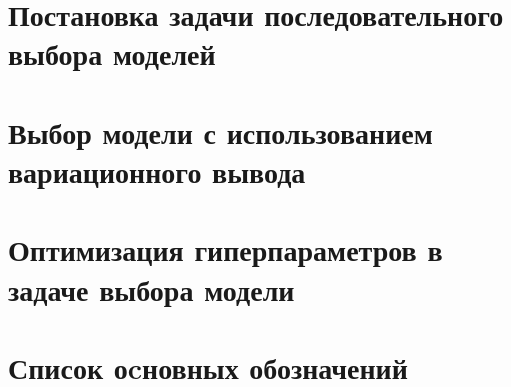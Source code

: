 \documentclass{dissert}
\theoremstyle{definition}
\begin{document}



\tableofcontents{}%

\clearpage

\chapter{Постановка задачи последовательного выбора моделей}


\clearpage
\chapter{Выбор модели с использованием вариационного вывода}


\clearpage


\chapter{Оптимизация гиперпараметров в задаче выбора модели}

\clearpage
\iffalse
\chapter{Выбор субоптимальной структуры модели}

\clearpage
\chapter{Анализ прикладных задач порождения и выбора моделей глубокого обучения}


\clearpage
\addcontentsline{toc}{section}{Заключение}



\clearpage

\fi
{}
\chapter*{Список оcновных обозначений}

\clearpage 
 
\listoffigures

\clearpage
{}
\listoftables

\clearpage

\renewcommand{\bibname}{Список использованных источников}


\end{document}
